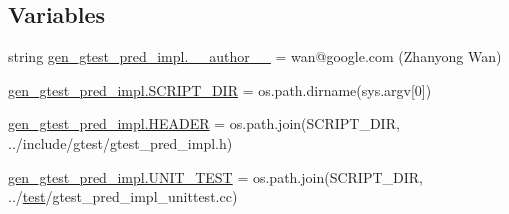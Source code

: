 \subsection*{Variables}
\begin{DoxyCompactItemize}
\item 
string \mbox{\hyperlink{namespacegen__gtest__pred__impl_af32e92d473ee6c427929cb7ddb4db7e6}{gen\+\_\+gtest\+\_\+pred\+\_\+impl.\+\_\+\+\_\+author\+\_\+\+\_\+}} = \textquotesingle{}wan@google.\+com (Zhanyong Wan)\textquotesingle{}
\item 
\mbox{\hyperlink{namespacegen__gtest__pred__impl_aed087c7fc787a064f0a9fd5f5f9f6487}{gen\+\_\+gtest\+\_\+pred\+\_\+impl.\+S\+C\+R\+I\+P\+T\+\_\+\+D\+IR}} = os.\+path.\+dirname(sys.\+argv\mbox{[}0\mbox{]})
\item 
\mbox{\hyperlink{namespacegen__gtest__pred__impl_ab96c63705e2cb7619876ba592dab4c8e}{gen\+\_\+gtest\+\_\+pred\+\_\+impl.\+H\+E\+A\+D\+ER}} = os.\+path.\+join(S\+C\+R\+I\+P\+T\+\_\+\+D\+IR, \textquotesingle{}../include/gtest/gtest\+\_\+pred\+\_\+impl.\+h\textquotesingle{})
\item 
\mbox{\hyperlink{namespacegen__gtest__pred__impl_a8c1cb8e87c4bd84edbb958f73b7df200}{gen\+\_\+gtest\+\_\+pred\+\_\+impl.\+U\+N\+I\+T\+\_\+\+T\+E\+ST}} = os.\+path.\+join(S\+C\+R\+I\+P\+T\+\_\+\+D\+IR, \textquotesingle{}../\mbox{\hyperlink{_mutual_8h_a707ee03719e99670bf6cfdfd897b8456}{test}}/gtest\+\_\+pred\+\_\+impl\+\_\+unittest.\+cc\textquotesingle{})
\end{DoxyCompactItemize}
